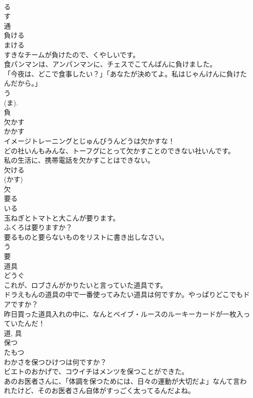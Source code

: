 \documentclass[8pt]{extreport}
\begin{document}
\begin{CJK}{UTF8}{min}
\\	る 
\\	す 
\\	通	
\\	負ける	
\\	まける	
\\	すきなチームが負けたので、くやしいです。	
\\	食パンマンは、アンパンマンに、チェスでこてんぱんに負けました。	
\\	「今夜は、どこで食事したい？」「あなたが決めてよ。私はじゃんけんに負けたんだから。」	
\\	う 
\\	(ま). 
\\	負	
\\	欠かす	
\\	かかす	
\\	イメージトレーニングとじゅんびうんどうは欠かすな！	
\\	どの社いんもみんな、トーフグにとって欠かすことのできない社いんです。	
\\	私の生活に、携帯電話を欠かすことはできない。	
\\	欠ける 
\\	(かす) 
\\	欠	
\\	要る	
\\	いる	
\\	玉ねぎとトマトと大こんが要ります。	
\\	ふくろは要りますか？	
\\	要るものと要らないものをリストに書き出しなさい。	
\\	う 
\\	要	
\\	道具	
\\	どうぐ	
\\	これが、ロブさんがかりたいと言っていた道具です。	
\\	ドラえもんの道具の中で一番使ってみたい道具は何ですか。やっぱりどこでもドアですか？	
\\	昨日買った道具入れの中に、なんとベイブ・ルースのルーキーカードが一枚入っていたんだ！	
\\	道, 具	
\\	保つ	
\\	たもつ	
\\	わかさを保つひけつは何ですか？	
\\	ビエトのおかげで、コウイチはメンツを保つことができた。	
\\	あのお医者さんに、「体調を保つためには、日々の運動が大切だよ」なんて言われたけど、そのお医者さん自体がすっごく太ってるんだよね。	

\end{CJK}
\end{document}
